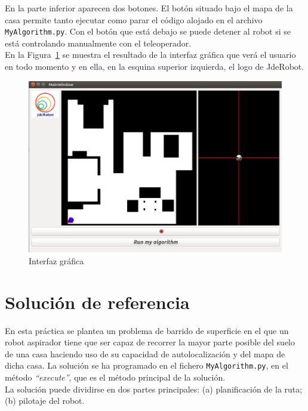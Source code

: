 En la parte inferior aparecen dos botones. El botón situado bajo el mapa de la casa permite tanto ejecutar como parar el código alojado en el archivo \texttt{MyAlgorithm.py}. Con el botón que está debajo se puede detener al robot si se está controlando manualmente con el teleoperador.\\


En la Figura~\ref{fig.vacuumGUI} se muestra el resultado de la interfaz gráfica que verá el usuario en todo momento y en ella, en la esquina superior izquierda, el logo de JdeRobot.

\begin{figure}[H]
  \begin{center}
    \includegraphics[width=1.0\textwidth]{figures/Vacuum/vacuumGUI.png}
		\caption{Interfaz gráfica}
		\label{fig.vacuumGUI}
		\end{center}
\end{figure}



\section{Solución de referencia} 
En esta práctica se plantea un problema de barrido de superficie en el que un robot aspirador tiene que ser capaz de recorrer la mayor parte posible del suelo de una casa haciendo uso de su capacidad de autolocalización y del mapa de dicha casa. La solución se ha programado en el fichero \texttt{MyAlgorithm.py}, en el método \textit{``execute''}, que es el método principal de la solución. \\

La solución puede dividirse en dos partes principales: (a) planificación de la ruta; (b) pilotaje del robot. 

